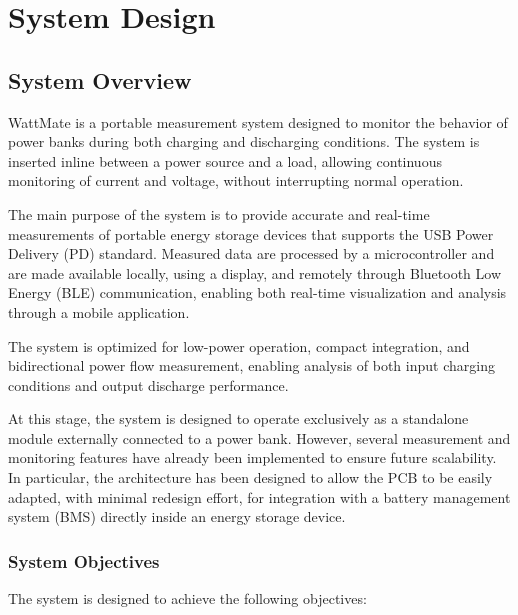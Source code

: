 \chapter{System Design}

\section{System Overview}

WattMate is a portable measurement system designed to monitor the behavior of power banks during both charging and discharging conditions. The system is inserted inline between a power source and a load, allowing continuous monitoring of current and voltage, without interrupting normal operation.

The main purpose of the system is to provide accurate and real-time measurements of portable energy storage devices that supports the USB Power Delivery (PD) standard. Measured data are processed by a microcontroller and are made available locally, using a display, and remotely through Bluetooth Low Energy (BLE) communication, enabling both real-time visualization and analysis through a mobile application.

The system is optimized for low-power operation, compact integration, and bidirectional power flow measurement, enabling analysis of both input charging conditions and output discharge performance.

At this stage, the system is designed to operate exclusively as a standalone module externally connected to a power bank. However, several measurement and monitoring features have already been implemented to ensure future scalability. In particular, the architecture has been designed to allow the PCB to be easily adapted, with minimal redesign effort, for integration with a battery management system (BMS) directly inside an energy storage device.

\subsection{System Objectives}\label{system_objectives}

The system is designed to achieve the following objectives:

